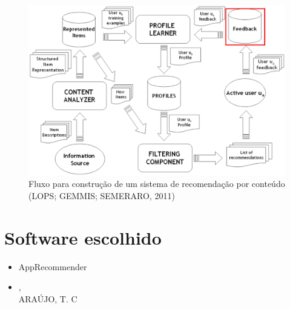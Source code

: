 \begin{frame}

\begin{figure}[h!]
  \centering
    \includegraphics[width=1\textwidth]{figura/recomendacao_conteudo_6.eps}
  \caption{Fluxo para construção de um sistema de recomendação por conteúdo (LOPS; GEMMIS; SEMERARO, 2011)}
\end{figure}

\end{frame}



\section{Software escolhido} %
\label{sec:software_escolhido}
\begin{frame}
\begin{itemize}
    \item AppRecommender

    \item {}, \\ARAÚJO, T. C
\end{itemize}
\end{frame}

